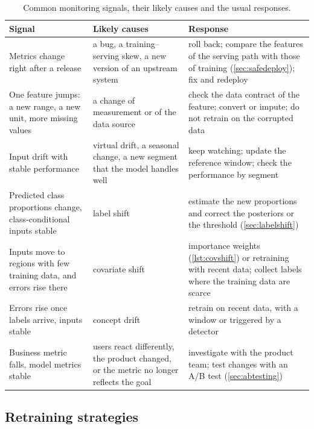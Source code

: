 \begin{table}[htbp]
\centering\small
\caption{Common monitoring signals, their likely causes and the usual responses.}\label{tab:alarms}
\begin{tabularx}{\textwidth}{@{}>{\raggedright\arraybackslash}p{3.5cm}>{\raggedright\arraybackslash}p{3.5cm}>{\raggedright\arraybackslash}X@{}}
\toprule
Signal & Likely causes & Response\\
\midrule
Metrics change right after a release & a bug, a training--serving skew, a new version of an upstream system &
roll back; compare the features of the serving path with those of training (\cref{sec:safedeploy}); fix and redeploy\\
One feature jumps: a new range, a new unit, more missing values & a change of measurement or of the data source &
check the data contract of the feature; convert or impute; do not retrain on the corrupted data\\
Input drift with stable performance & virtual drift, a seasonal change, a new segment that the model handles well &
keep watching; update the reference window; check the performance by segment\\
Predicted class proportions change, class-conditional inputs stable & label shift &
estimate the new proportions and correct the posteriors or the threshold (\cref{sec:labelshift})\\
Inputs move to regions with few training data, and errors rise there & covariate shift &
importance weights (\cref{lst:covshift}) or retraining with recent data; collect labels where the training data are scarce\\
Errors rise once labels arrive, inputs stable & concept drift &
retrain on recent data, with a window or triggered by a detector\\
Business metric falls, model metrics stable & users react differently, the product changed, or the metric no longer reflects the goal &
investigate with the product team; test changes with an A/B test (\cref{sec:abtesting})\\
\bottomrule
\end{tabularx}
\end{table}

\subsection{Retraining strategies}


